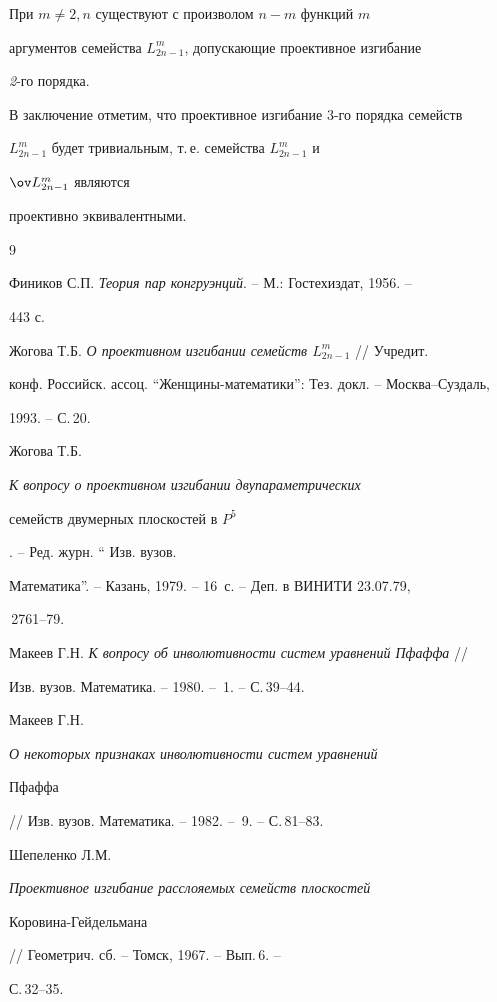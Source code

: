  


\begin{thm} При $m\ne 2,n$ существуют с произволом $n-m$ функций $m$ 


аргументов семейства $L^m_{2n-1}$, допускающие проективное изгибание 


{\em 2}-го порядка. 


\end{thm} 


 


В заключение отметим, что проективное изгибание 3-го порядка семейств 


$L^m_{2n-1}$ будет тривиальным, т.\,е. семейства $L^m_{2n-1}$ и 


$\ov L^m_{2n-1}$ являются 


проективно эквивалентными. 


 


\begin{thebibliography}{9} 


 




Фиников С.П. {\em Теория пар конгруэнций}. -- М.: Гостехиздат, 1956. -- 


443 с. 




Жогова Т.Б. {\em О проективном изгибании семейств $L^m_{2n-1}$} // Учредит.


конф. Российск. ассоц. ``Женщины-математики'': Тез. докл. -- Москва--Суздаль, 


1993. -- С.\,20. 




Жогова Т.Б. {\em К вопросу о проективном изгибании двупараметрических 


семейств двумерных плоскостей в $P^5$}. -- Ред. журн. `` Изв. вузов. 


Математика''. -- Казань, 1979. -- 16~с. -- Деп. в ВИНИТИ 23.07.79, 


\No\,2761--79. 




Макеев Г.Н. {\em К вопросу об инволютивности систем уравнений Пфаффа} // 


Изв. вузов. Математика. -- 1980. -- \No\,1. -- С.\,39--44. 




Макеев Г.Н. {\em О некоторых признаках инволютивности систем уравнений 


Пфаффа} // Изв. вузов. Математика. -- 1982. -- \No\,9. -- С.\,81--83. 




Шепеленко Л.М. {\em Проективное изгибание расслояемых семейств плоскостей 


Коровина-Гейдельмана} // Геометрич. сб. -- Томск, 1967. -- Вып.\,6. -- 


С.\,32--35. 


 


 


\end{thebibliography} 


